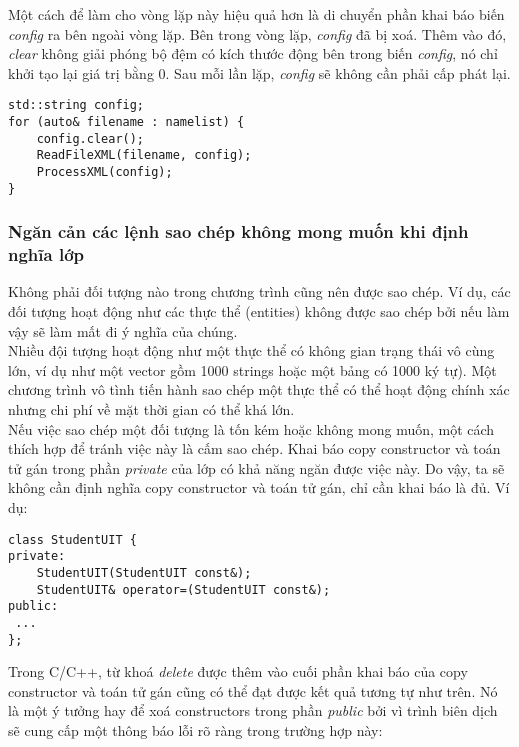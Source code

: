 \documentclass{article}
\begin{document}
Một cách để làm cho vòng lặp này hiệu quả hơn là di chuyển phần khai báo biến \textit{config} ra bên ngoài vòng lặp. Bên trong vòng lặp, \textit{config} đã bị xoá. Thêm vào đó, \textit{clear} không giải phóng bộ đệm có kích thước động bên trong biến \textit{config}, nó chỉ khởi tạo lại giá trị bằng 0. Sau mỗi lần lặp, \textit{config} sẽ không cần phải cấp phát lại.

\begin{verbatim}
std::string config;
for (auto& filename : namelist) {
    config.clear();
    ReadFileXML(filename, config);
    ProcessXML(config);
}
\end{verbatim}

\subsubsection{Ngăn cản các lệnh sao chép không mong muốn khi định nghĩa lớp}
Không phải đối tượng nào trong chương trình cũng nên được sao chép. Ví dụ, các đối tượng hoạt động như các thực thể (entities) không được sao chép bởi nếu làm vậy sẽ làm mất đi ý nghĩa của chúng.\\

Nhiều đội tượng hoạt động như một thực thể có không gian trạng thái vô cùng lớn, ví dụ như một vector gồm 1000 strings hoặc một bảng có 1000 ký tự). Một chương trình vô tình tiến hành sao chép một thực thể có thể hoạt động chính xác nhưng chi phí về mặt thời gian có thể khá lớn.\\

Nếu việc sao chép một đối tượng là tốn kém hoặc không mong muốn, một cách thích hợp để tránh việc này là cấm sao chép. Khai báo copy constructor và toán tử gán trong phần \textit{private} của lớp có khả năng ngăn được việc này. Do vậy, ta sẽ không cần định nghĩa copy constructor và toán tử gán, chỉ cần khai báo là đủ. Ví dụ:\\

\begin{verbatim}
class StudentUIT {
private:
    StudentUIT(StudentUIT const&);
    StudentUIT& operator=(StudentUIT const&);
public:
 ...
};
\end{verbatim}

Trong C/C++, từ khoá \textit{delete} được thêm vào cuối phần khai báo của copy constructor và toán tử gán cũng có thể đạt được kết quả tương tự như trên. Nó là một ý tưởng hay để xoá constructors trong phần \textit{public} bởi vì trình biên dịch sẽ cung cấp một thông báo lỗi rõ ràng trong trường hợp này: \\
\end{document}
